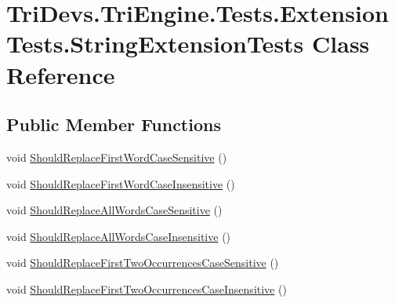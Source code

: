 \hypertarget{class_tri_devs_1_1_tri_engine_1_1_tests_1_1_extension_tests_1_1_string_extension_tests}{\section{Tri\-Devs.\-Tri\-Engine.\-Tests.\-Extension\-Tests.\-String\-Extension\-Tests Class Reference}
\label{class_tri_devs_1_1_tri_engine_1_1_tests_1_1_extension_tests_1_1_string_extension_tests}
}
\subsection*{Public Member Functions}
\begin{DoxyCompactItemize}
\item 
void \hyperlink{class_tri_devs_1_1_tri_engine_1_1_tests_1_1_extension_tests_1_1_string_extension_tests_abf5efd96236f757b56eb2341cd12a6e8}{Should\-Replace\-First\-Word\-Case\-Sensitive} ()
\item 
void \hyperlink{class_tri_devs_1_1_tri_engine_1_1_tests_1_1_extension_tests_1_1_string_extension_tests_ac31d2f256a5000e5c16f99db38903d98}{Should\-Replace\-First\-Word\-Case\-Insensitive} ()
\item 
void \hyperlink{class_tri_devs_1_1_tri_engine_1_1_tests_1_1_extension_tests_1_1_string_extension_tests_a2b9f1d18b6725aa3f290b251f6bc8ae7}{Should\-Replace\-All\-Words\-Case\-Sensitive} ()
\item 
void \hyperlink{class_tri_devs_1_1_tri_engine_1_1_tests_1_1_extension_tests_1_1_string_extension_tests_adf03ce6f9af6abefab3dc29186b14d52}{Should\-Replace\-All\-Words\-Case\-Insensitive} ()
\item 
void \hyperlink{class_tri_devs_1_1_tri_engine_1_1_tests_1_1_extension_tests_1_1_string_extension_tests_a2977ad290095f760adac76a0b4eae834}{Should\-Replace\-First\-Two\-Occurrences\-Case\-Sensitive} ()
\item 
void \hyperlink{class_tri_devs_1_1_tri_engine_1_1_tests_1_1_extension_tests_1_1_string_extension_tests_a7adb42643d30bae921ed4635c8b637c6}{Should\-Replace\-First\-Two\-Occurrences\-Case\-Insensitive} ()
\end{DoxyCompactItemize}


